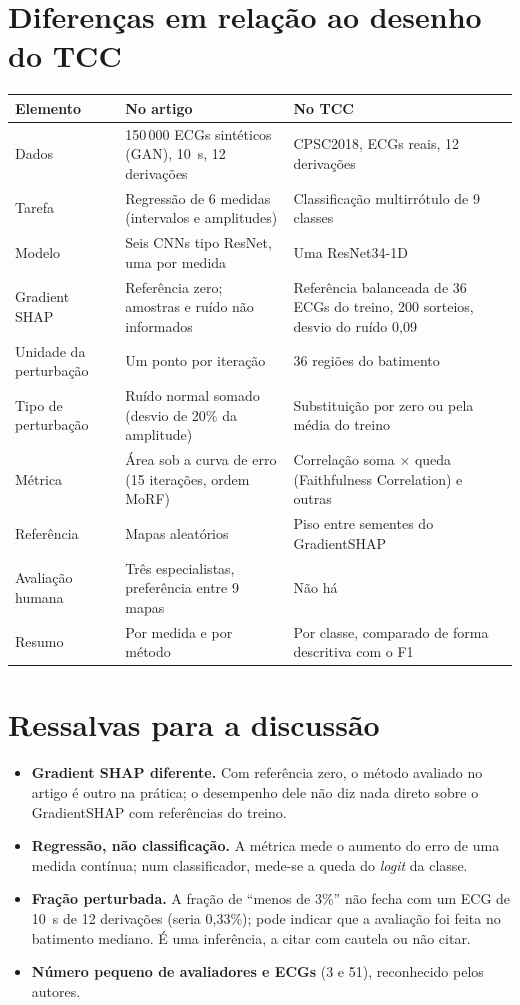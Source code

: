 \documentclass[11pt,a4paper]{article}
\begin{document}
\section{Diferenças em relação ao desenho do TCC}
\begin{center}\small
\begin{tabularx}{\linewidth}{lXX}
\toprule
\textbf{Elemento} & \textbf{No artigo} & \textbf{No TCC} \\
\midrule
Dados & 150\,000 ECGs sintéticos (GAN), 10~s, 12 derivações & CPSC2018, ECGs reais, 12 derivações \\ \addlinespace
Tarefa & Regressão de 6 medidas (intervalos e amplitudes) & Classificação multirrótulo de 9 classes \\ \addlinespace
Modelo & Seis CNNs tipo ResNet, uma por medida & Uma ResNet34-1D \\ \addlinespace
Gradient SHAP & Referência zero; amostras e ruído não informados & Referência balanceada de 36 ECGs do treino, 200 sorteios, desvio do ruído 0,09 \\ \addlinespace
Unidade da perturbação & Um ponto por iteração & 36 regiões do batimento \\ \addlinespace
Tipo de perturbação & Ruído normal somado (desvio de 20\% da amplitude) & Substituição por zero ou pela média do treino \\ \addlinespace
Métrica & Área sob a curva de erro (15 iterações, ordem MoRF) & Correlação soma × queda (Faithfulness Correlation) e outras \\ \addlinespace
Referência & Mapas aleatórios & Piso entre sementes do GradientSHAP \\ \addlinespace
Avaliação humana & Três especialistas, preferência entre 9 mapas & Não há \\ \addlinespace
Resumo & Por medida e por método & Por classe, comparado de forma descritiva com o F1 \\
\bottomrule
\end{tabularx}
\end{center}

\section{Ressalvas para a discussão}
\begin{itemize}
\item \textbf{Gradient SHAP diferente.} Com referência zero, o método avaliado no artigo é outro na prática; o desempenho dele não diz nada direto sobre o GradientSHAP com referências do treino.
\item \textbf{Regressão, não classificação.} A métrica mede o aumento do erro de uma medida contínua; num classificador, mede-se a queda do \textit{logit} da classe.
\item \textbf{Fração perturbada.} A fração de “menos de 3\%” não fecha com um ECG de 10~s de 12 derivações (seria 0,33\%); pode indicar que a avaliação foi feita no batimento mediano. É uma inferência, a citar com cautela ou não citar.
\item \textbf{Número pequeno de avaliadores e ECGs} (3 e 51), reconhecido pelos autores.
\end{itemize}
\end{document}
